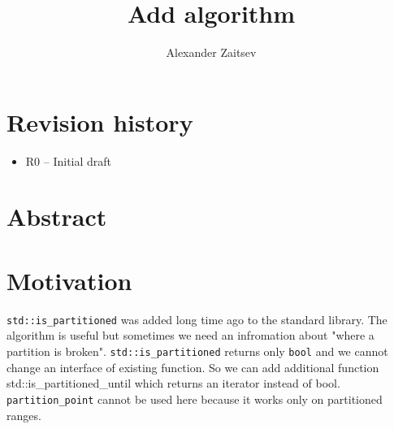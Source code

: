 \documentclass{wg21}
\title{Add \cc{std::is_partitioned_until} algorithm}
\author{Alexander Zaitsev}{zamazan4ik@tut.by, zamazan4ik@gmail.com}
\newcommand{\cc}[1]{\texttt{#1}}
\begin{document}
\maketitle

\section{Revision history}
\begin{itemize}
  \item R0 -- Initial draft
\end{itemize}


\section{Abstract}


\section{Motivation}
\cc{std::is_partitioned} was added long time ago to the standard library. The algorithm is useful but sometimes we need an infromation about "where a partition is broken". \cc{std::is_partitioned} returns only \cc{bool} and we cannot change an interface of existing function. So we can add additional function {std::is_partitioned_until} which returns an iterator instead of bool. \cc{partition_point} cannot be used here because it works only on partitioned ranges.
\end{document}
